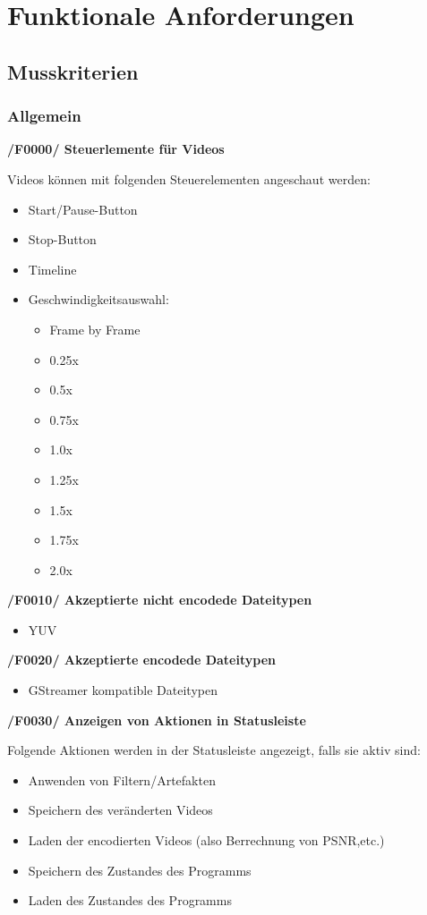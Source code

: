 \documentclass[parskip=full]{scrartcl}
\begin{document}
\section{Funktionale Anforderungen}
\subsection{Musskriterien}
\subsubsection{Allgemein}
\textbf{/F0000/ Steuerlemente für Videos}

Videos können mit folgenden Steuerelementen angeschaut werden:
\begin{itemize}
\item Start/Pause-Button
\item Stop-Button
\item Timeline
\item Geschwindigkeitsauswahl:
\begin{itemize}
\item Frame by Frame
\item 0.25x
\item 0.5x
\item 0.75x
\item 1.0x
\item 1.25x
\item 1.5x
\item 1.75x
\item 2.0x
\end{itemize}
\end{itemize}

\textbf{/F0010/ Akzeptierte nicht encodede Dateitypen}

\begin{itemize}
\item YUV
\end{itemize}
\newpage
\textbf{/F0020/ Akzeptierte encodede Dateitypen}
\begin{itemize}
\item GStreamer kompatible Dateitypen
\end{itemize}

\textbf{/F0030/ Anzeigen von Aktionen in Statusleiste}

Folgende Aktionen werden in der Statusleiste angezeigt, falls sie aktiv sind:
\begin{itemize}
\item Anwenden von Filtern/Artefakten
\item Speichern des veränderten Videos
\item Laden der encodierten Videos (also Berrechnung von PSNR,etc.)
\item Speichern des Zustandes des Programms
\item Laden des Zustandes des Programms
\end{itemize}
\end{document}
